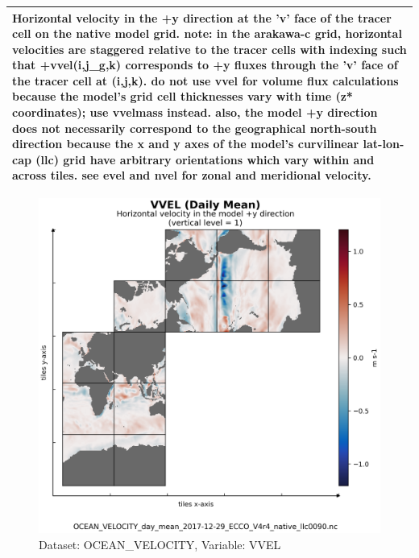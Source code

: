 \begin{longtable}{|m{}|m{}|m{}|m{}|}
\multicolumn{4}{|p{1\textwidth}|}{\footnotesize{{Horizontal velocity in the +y direction at the 'v' face of the tracer cell on the native model grid. note: in the arakawa-c grid, horizontal velocities are staggered relative to the tracer cells with indexing such that +vvel(i,j\_g,k) corresponds to +y fluxes through the 'v' face of the tracer cell at (i,j,k). do not use vvel for volume flux calculations because the model's grid cell thicknesses vary with time (z* coordinates); use vvelmass instead. also, the model +y direction does not necessarily correspond to the geographical north-south direction because the x and y axes of the model's curvilinear lat-lon-cap (llc) grid have arbitrary orientations which vary within and across tiles. see evel and nvel for zonal and meridional velocity.}}} \\ \hline
\end{longtable}

\begin{figure}[H]
\centering
\includegraphics[scale=0.55]{../images/plots/v4r4/native_plots/Ocean_Velocity/VVEL.png}
\caption{Dataset: OCEAN\_VELOCITY, Variable: VVEL}
\label{tab:table-OCEAN_VELOCITY_VVEL-Plot}
\end{figure}
\newpage
\pagebreak
